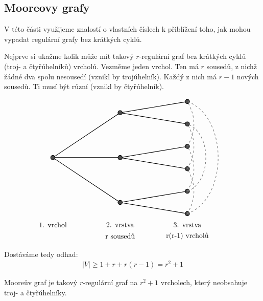 \subsection{Mooreovy grafy}

V této části využijeme znalostí o vlastních číslech k přiblížení toho, jak mohou vypadat regulární grafy bez krátkých cyklů.

Nejprve si ukažme kolik může mít takový $r$-regulární graf bez krátkých cyklů (troj- a čtyřúhelníků) vrcholů. 
Vezměme jeden vrchol. Ten má $r$ sousedů, z nichž žádné dva spolu nesousedí (vznikl by trojúhelník). Každý z nich má $r-1$ nových sousedů. Ti musí být různí (vznikl by čtyřúhelník).

\begin{align}
\label{4-2:graf-Petersen}
\begin{tikzpicture}[thick,scale=1.1]
\draw (0,0) -- (3,2) (0,0) -- (3,0) (0,0) -- (3,-2);
\draw (0,0) \vrchol;
\draw (3,2) -- (6,2.5) \vrchol (3,2) -- (6,1.5) \vrchol;
\draw (3,2) \vrchol;
\draw (3,0) -- (6,0.5) \vrchol (3,0) -- (6,-0.5) \vrchol;
\draw (3,0) \vrchol;
\draw (3,-2) -- (6,-1.5) \vrchol (3,-2) -- (6,-2.5) \vrchol;
\draw (3,-2) \vrchol;
\draw[black!50, dashed] (6,0.5) to[bend right] (6,2.5);
\draw[black!50, dashed] (6,-2.5) to[out=20,in=340] (6,2.5);
\draw[black!50, dashed] (6,-0.5) to[bend right] (6,1.5);
\draw[black!50, dashed] (6,-1.5) to[out=20,in=340] (6,1.5);
\draw[black!50, dashed] (6,-1.5) to[bend right] (6,0.5);
\draw[black!50, dashed] (6,-2.5) to[bend right] (6,-0.5);
\draw (0,-3) node {1. vrchol};
\draw (3,-3) node {2. vrstva};
\draw (3,-3.5) node {r sousedů};
\draw (6,-3) node {3. vrstva};
\draw (6,-3.5) node {r(r-1) vrcholů};
\end{tikzpicture}
\end{align}
Dostáváme tedy odhad:
\begin{align}
|V| \geq 1 + r + r(r-1) = r^2 + 1
\end{align}

\df Mooreův graf je takový $r$-regulární graf na $r^2 + 1$ vrcholech, který neobsahuje troj- a čtyřúhelníky.

